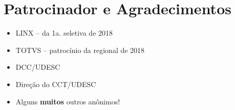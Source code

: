 \documentclass[12pt,oneside]{article}
\begin{document}
\vfill
\section{Patrocinador e Agradecimentos}
\begin{itemize}
\setlength\itemsep{-3pt}
\item LINX -- da 1a. seletiva de 2018
\item TOTVS -- patrocínio da regional de 2018
\item DCC/UDESC
\item Direção do CCT/UDESC
\item Alguns \textbf{muitos} outros anônimos! 
\end{itemize}
\end{document}
